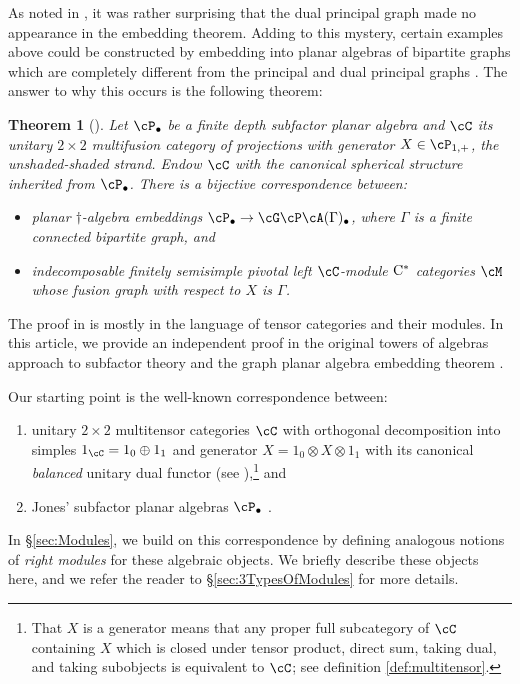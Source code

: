 \documentclass[11pt]{article}
\theoremstyle{plain}
\newtheorem{thm}{Theorem}[section]
\theoremstyle{definition}
\newcommand{\Cstar}{\rm{C^*}}
\begin{document}
As noted in \cite{MR2812459}, it was rather surprising that the dual principal graph made no appearance in the embedding theorem.
Adding to this mystery, certain examples above could be constructed by embedding into planar algebras of bipartite graphs which are completely different from the principal and dual principal graphs \cite{MR2679382,MR3402358,EH3}.
The answer to why this occurs is the following theorem:

\begin{thm}[\cite{EH3}]
Let $\cP_\bullet$ be a finite depth subfactor planar algebra and $\cC$ its unitary $2\times 2$ multifusion category of projections with generator $X \in \cP_{1,+}$, the unshaded-shaded strand.
Endow $\cC$ with the canonical spherical structure inherited from $\cP_\bullet$.
There is a bijective correspondence between:
\begin{itemize}
\item
planar $\dag$-algebra embeddings $\cP_\bullet \to \cG\cP\cA(\Gamma)_\bullet$, where $\Gamma$ is a finite connected bipartite graph, and 
\item
indecomposable finitely semisimple pivotal left $\cC$-module $\Cstar$ categories $\cM$ whose fusion graph with respect to $X$ is $\Gamma$.
\end{itemize}
\end{thm}

The proof in \cite{EH3} is mostly in the language of tensor categories and their modules.
In this article, we provide an independent proof in the original towers of algebras approach to subfactor theory \cite{MR936086,MR999799,MR1278111} and the graph planar algebra embedding theorem \cite{MR2812459}.

Our starting point is the well-known correspondence between:
\begin{enumerate}[label={\rm(\arabic*)}]
\item
unitary $2\times 2$ multitensor categories $\cC$ with orthogonal decomposition into simples $1_\cC = 1_0 \oplus 1_1$ and generator $X = 1_0 \otimes X \otimes 1_1$ with its canonical \emph{balanced} unitary dual functor
(see \cite{MR2091457,1808.00323}),\footnote{
 That $X$ is a generator means that any proper full subcategory of $\cC$ containing $X$ which is closed under tensor product, direct sum, taking dual, and taking subobjects is equivalent to $\cC$; see definition \ref{def:multitensor}. 
} 
and
\item
Jones' subfactor planar algebras $\cP_\bullet$ \cite{math.QA/9909027}.
\end{enumerate}
In \S\ref{sec:Modules}, we build on this correspondence by defining analogous notions of \emph{right modules} for these algebraic objects.
We briefly describe these objects here, and we refer the reader to \S\ref{sec:3TypesOfModules} for more details.
\end{document}
